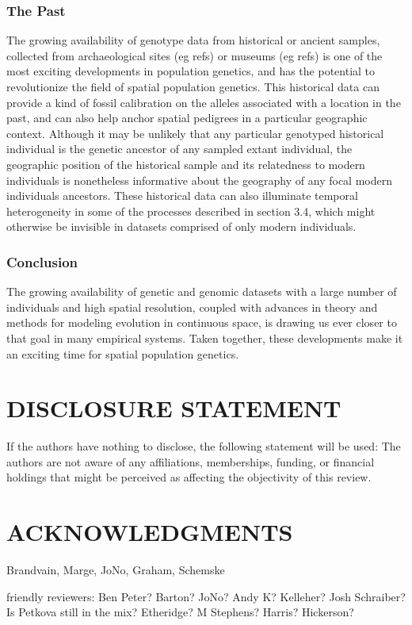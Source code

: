 \documentclass{ar-1col}
\begin{document}
\subsubsection{The Past} 
The growing availability of genotype data from historical or ancient samples, 
collected from archaeological sites (eg refs) or museums (eg refs) 
is one of the most exciting developments in population genetics, 
and has the potential to revolutionize the field of spatial population genetics.
This historical data can provide a kind of fossil calibration on 
the alleles associated with a location in the past, 
and can also help anchor spatial pedigrees in a particular geographic context.
Although it may be unlikely that any particular genotyped historical individual 
is the genetic ancestor of any sampled extant individual, 
the geographic position of the historical sample and its 
relatedness to modern individuals is nonetheless informative 
about the geography of any focal modern individuals ancestors.
These historical data can also illuminate temporal heterogeneity 
in some of the processes described in section 3.4, 
which might otherwise be invisible in datasets comprised of only modern individuals.

\subsubsection{Conclusion}
The growing availability of genetic and genomic datasets 
with a large number of individuals and high spatial resolution, 
coupled with advances in theory and methods 
for modeling evolution in continuous space, 
is drawing us ever closer to that goal in many empirical systems.
Taken together, these developments make it 
an exciting time for spatial population genetics.


\section*{DISCLOSURE STATEMENT}
If the authors have nothing to disclose, the following statement will be used: The authors are not aware of any affiliations, memberships, funding, or financial holdings that
might be perceived as affecting the objectivity of this review.

\section*{ACKNOWLEDGMENTS}
Brandvain, Marge, JoNo, Graham, Schemske


friendly reviewers:
Ben Peter? Barton? JoNo? Andy K? Kelleher? Josh Schraiber? Is Petkova still in the mix?
Etheridge? M Stephens? Harris? Hickerson?



\end{document}
